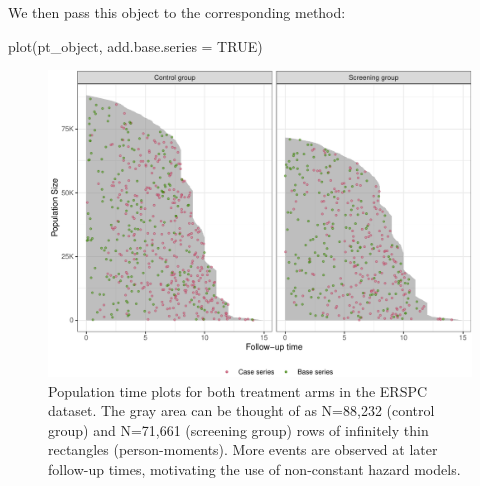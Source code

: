 We then pass this object to the corresponding  method:

\begin{Schunk}
\begin{Sinput}
plot(pt_object, add.base.series = TRUE)
\end{Sinput}
\end{Schunk}

\begin{Schunk}
\begin{figure}[ht]
\includegraphics[width=\textwidth,keepaspectratio=true]{../figures/plot-stratified-erspc-data-1} \caption[Population time plots for both treatment arms in the ERSPC dataset]{Population time plots for both treatment arms in the ERSPC dataset. The gray area can be thought of as N=88,232 (control group) and N=71,661 (screening group) rows of infinitely thin rectangles (person-moments). More events are observed at later follow-up times, motivating the use of non-constant hazard models.}\label{fig:plot-stratified-erspc-data}
\end{figure}
\end{Schunk}

